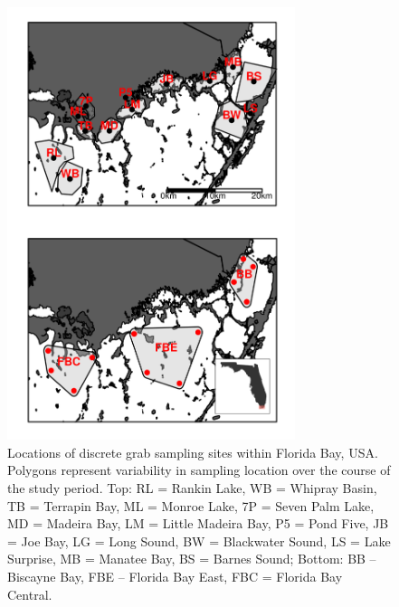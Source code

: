 

%
%

\newpage

\begin{figure}
  \centering
  \includegraphics[width=0.75\textwidth]{../../figures/fbmap.png}
  \caption{Locations of discrete grab sampling sites within Florida Bay, USA. Polygons represent variability in sampling location over the course of the study period. Top: RL = Rankin Lake, WB = Whipray Basin, TB = Terrapin Bay, ML = Monroe Lake, 7P = Seven Palm Lake, MD = Madeira Bay, LM = Little Madeira Bay, P5 = Pond Five, JB = Joe Bay, LG = Long Sound, BW = Blackwater Sound, LS = Lake Surprise, MB = Manatee Bay, BS = Barnes Sound; Bottom: BB – Biscayne Bay, FBE – Florida Bay East, FBC = Florida Bay Central.}
  \label{fig:1}
\end{figure}


